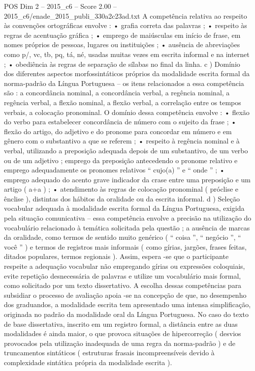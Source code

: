 \begin{textsample}{POS Dim 2 – 2015\_c6 – Score 2.00 – 2015\_c6/enade\_2015\_publi\_330a2c23ad.txt}
A competência relativa ao respeito às convenções ortográficas envolve : • grafia correta das palavras ; • respeito às regras de acentuação gráfica ; • emprego de maiúsculas em início de frase, em nomes próprios de pessoas, lugares ou instituições ; • ausência de abreviações como p/, vc, tb, pq, tá, né, usadas muitas vezes em escrita informal e na internet ; • obediência às regras de separação de sílabas no final da linha. c ) Domínio dos diferentes aspectos morfossintáticos próprios da modalidade escrita formal da norma-padrão da Língua Portuguesa – os itens relacionados a essa competência são : a concordância nominal, a concordância verbal, a regência nominal, a regência verbal, a flexão nominal, a flexão verbal, a correlação entre os tempos verbais, a colocação pronominal.
O domínio dessa competência envolve : • flexão do verbo para estabelecer concordância de número com o sujeito da frase ; • flexão do artigo, do adjetivo e do pronome para concordar em número e em gênero com o substantivo a que se referem ; • respeito à regência nominal e à verbal, utilizando a preposição adequada depois de um substantivo, de um verbo ou de um adjetivo ; emprego da preposição antecedendo o pronome relativo e emprego adequadamente os pronomes relativos “ cujo(a) ” e “ onde ” ; • emprego adequado do acento grave indicador da crase entre uma preposição e um artigo ( a+a ) ; • atendimento às regras de colocação pronominal ( próclise e ênclise ), distintas dos hábitos da oralidade ou da escrita informal. d ) Seleção vocabular adequada à modalidade escrita formal da Língua Portuguesa, exigida pela situação comunicativa – essa competência envolve a precisão na utilização do vocabulário relacionado à temática solicitada pela questão ; a ausência de marcas da oralidade, como termos de sentido muito genérico ( “ coisa ”, “ negócio ”, “ você ” ) e termos de registros mais informais ( como gírias, jargões, frases feitas, ditados populares, termos regionais ).
Assim, espera -se que o participante respeite a adequação vocabular não empregando gírias ou expressões coloquiais, evite repetição desnecessária de palavras e utilize um vocabulário mais formal, como solicitado por um texto dissertativo.
A escolha dessas competências para subsidiar o processo de avaliação apoia -se na concepção de que, no desempenho dos graduandos, a modalidade escrita tem apresentado uma intensa simplificação, originada no padrão da modalidade oral da Língua Portuguesa.
No caso do texto de base dissertativa, inscrito em um registro formal, a distância entre as duas modalidades é ainda maior, o que provoca situações de hipercorreção ( desvios provocados pela utilização inadequada de uma regra da norma-padrão ) e de truncamentos sintáticos ( estruturas frasais incompreensíveis devido à complexidade sintática própria da modalidade escrita ).

\end{textsample}
